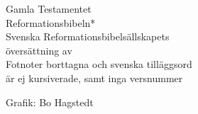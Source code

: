 \begin{center}
    {\fontsize{45}{50}\selectfont Gamla Testamentet}\\[1em]

    {\fontsize{20}{24}\selectfont 
    {Reformationsbibeln*} }\\[1em]

    {\fontsize{12}{15}\selectfont Svenska Reformationsbibelsällskapets\\[0.5em]
    översättning av}\\[1.2em]





    {\fontsize{11}{13} \selectfont *Fotnoter borttagna och svenska tilläggsord\\ är ej kursiverade, samt inga versnummer}

 {\fontsize{8}{10} \selectfont Grafik: Bo Hagstedt}
 
\end{center}